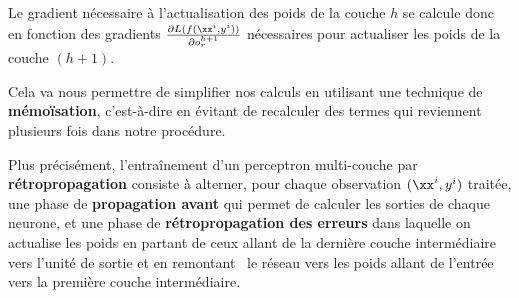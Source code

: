 Le gradient nécessaire à l'actualisation des poids de la couche $h$ se
calcule donc en fonction des gradients
$\frac{\partial L(f(\xx^i, y^i))}{\partial o^{h+1}_r}$ nécessaires pour
actualiser les poids de la couche $(h+1)$.

Cela va nous permettre de simplifier nos calculs en utilisant une technique de
\textbf{mémoïsation}, c'est-à-dire en évitant de recalculer des termes qui
reviennent plusieurs fois dans notre procédure.

Plus précisément, l'entraînement d'un perceptron multi-couche par
\textbf{rétropropagation} consiste à alterner, pour chaque observation
$(\xx^i, y^i)$ traitée, une phase de \textbf{propagation avant} qui permet de
calculer les sorties de chaque neurone, et une phase de
\textbf{rétropropagation des erreurs} dans laquelle on actualise les poids en
partant de ceux allant de la dernière couche intermédiaire vers l'unité de
sortie et en \og remontant \fg~le réseau vers les poids allant de l'entrée vers
la première couche intermédiaire.

